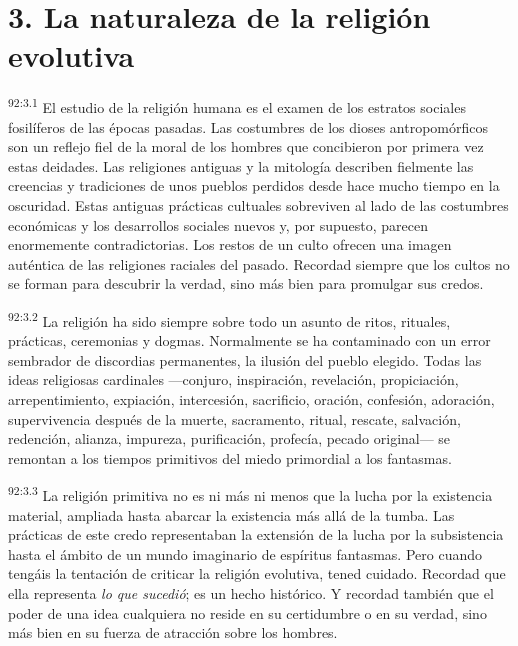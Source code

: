 \section*{3. La naturaleza de la religión evolutiva}
\par
\textsuperscript{92:3.1} El estudio de la religión humana es el examen de los estratos sociales fosilíferos de las épocas pasadas. Las costumbres de los dioses antropomórficos son un reflejo fiel de la moral de los hombres que concibieron por primera vez estas deidades. Las religiones antiguas y la mitología describen fielmente las creencias y tradiciones de unos pueblos perdidos desde hace mucho tiempo en la oscuridad. Estas antiguas prácticas cultuales sobreviven al lado de las costumbres económicas y los desarrollos sociales nuevos y, por supuesto, parecen enormemente contradictorias. Los restos de un culto ofrecen una imagen auténtica de las religiones raciales del pasado. Recordad siempre que los cultos no se forman para descubrir la verdad, sino más bien para promulgar sus credos.

\par
\textsuperscript{92:3.2} La religión ha sido siempre sobre todo un asunto de ritos, rituales, prácticas, ceremonias y dogmas. Normalmente se ha contaminado con un error sembrador de discordias permanentes, la ilusión del pueblo elegido. Todas las ideas religiosas cardinales ---conjuro, inspiración, revelación, propiciación, arrepentimiento, expiación, intercesión, sacrificio, oración, confesión, adoración, supervivencia después de la muerte, sacramento, ritual, rescate, salvación, redención, alianza, impureza, purificación, profecía, pecado original--- se remontan a los tiempos primitivos del miedo primordial a los fantasmas.

\par
\textsuperscript{92:3.3} La religión primitiva no es ni más ni menos que la lucha por la existencia material, ampliada hasta abarcar la existencia más allá de la tumba. Las prácticas de este credo representaban la extensión de la lucha por la subsistencia hasta el ámbito de un mundo imaginario de espíritus fantasmas. Pero cuando tengáis la tentación de criticar la religión evolutiva, tened cuidado. Recordad que ella representa \textit{lo que sucedió}; es un hecho histórico. Y recordad también que el poder de una idea cualquiera no reside en su certidumbre o en su verdad, sino más bien en su fuerza de atracción sobre los hombres.

